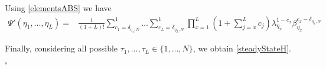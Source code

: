 \documentclass[10pt]{article}
\numberwithin{equation}{section}
\numberwithin{equation}{subsection}
\begin{document}
		Using \eqref{elementsABS} we have 
		\begin{equation}
			\begin{split}
				\Psi{'}(\eta_{1},\ldots,\eta_{L})=&\frac{1}{(1+L)!}\sum_{c_{1}=\delta_{\eta_{1},N}}^{1}\ldots\sum_{c_{L}=\delta_{\eta_{L},N}}^{1}\prod_{x=1}^{L}\left(1+\sum_{j=x}^{L}c_{j}\right)\lambda_{\eta_{x}}^{1-c_{x}}\beta_{\eta_{x}}^{c_{x}-\delta_{\eta_{x},N}}
			\end{split}
		\end{equation}
	\begin{comment}
		{\color{blue}
			\begin{equation}
				\begin{split}
					&\Psi{'}(\ldots,\tau_{x},\ldots,d_{q_{r}},\ldots)=\sum_{x=1\,:\, x\neq q_{1},\ldots,q_{l}}^{L}\sum_{c_{x}=0}^{1-\delta_{\tau_{x},N}}\sum_{d_{q_{1}}=2}^{N}\ldots\sum_{c_{q_{p}}=0}^{1}\frac{\Gamma(2+L-\sum_{z=1}^{L}c_{z})}{\Gamma(2+L)}
					\\&  
					\prod_{y=1\,:\, y\neq q_{1},\ldots,q_{b}}^{L}\left(\lambda_{\tau_{y}}\left(2+L-y-\sum_{j=y}^{L}c_{j}\right)\right)^{c_{y}}\beta_{\tau_{y}}^{(1-c_{y})(1-\delta_{\tau_{y},N})}
					\\&
					\prod_{t=1}^{b}\lambda_{d_{q_{t}}}\left(2+L-q_{t}-\sum_{j=q_{t}}^{L}c_{j}\right)^{c_{q_{t}}}\beta_{d_{q_{t}}}^{(1-c_{q_{t}})}
				\end{split}
		\end{equation}} 

indeed, in each coordinate $q_{r}$ with $r=1,\ldots b$ the species $N$ is replaced by all other possible species from $1$ to $N-1$.
\end{comment}
 Finally, considering all possible $\tau_{1},\ldots,\tau_{L}\in \{1,\ldots,N\}$, we obtain \eqref{steadyStateH}. 
		\begin{flushright}
			$\square$
		\end{flushright}
\end{document}
